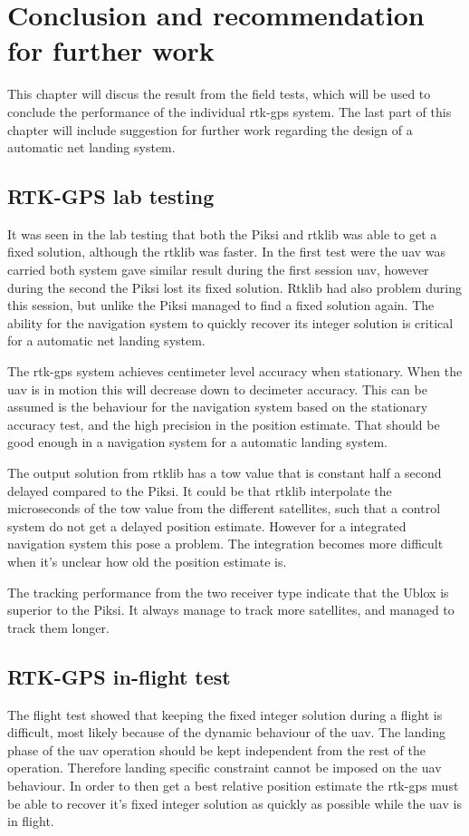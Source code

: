 
\chapter{Conclusion and recommendation for further work}
This chapter will discus the result from the field tests, which will be used to conclude the performance of the individual \gls{rtk-gps} system. The last part of this chapter will include suggestion for further work regarding the design of a automatic net landing system.
\section{RTK-GPS lab testing}
It was seen in the lab testing that both the Piksi and \gls{rtklib} was able to get a fixed solution, although the \gls{rtklib} was faster. In the first test were the \gls{uav} was carried both system gave similar result during the first session \gls{uav}, however during the second the Piksi lost its fixed solution. Rtklib had also problem during this session, but unlike the Piksi managed to find a fixed solution again. The ability for the navigation system to quickly recover its integer solution is critical for a automatic net landing system.

The \gls{rtk-gps} system achieves centimeter level accuracy when stationary. When the \gls{uav} is in motion this will decrease down to decimeter accuracy. This can be assumed is the behaviour for the navigation system based on the stationary accuracy test, and the high precision in the position estimate. That should be good enough in a navigation system for a automatic landing system.

The output solution from \gls{rtklib} has a \acrfull{tow} value that is constant half a second delayed compared to the Piksi. It could be that \gls{rtklib} interpolate the microseconds of the \gls{tow} value from the different satellites, such that a control system do not get a delayed position estimate. However for a integrated navigation system this pose a problem. The integration becomes more difficult when it's unclear how old the position estimate is.

The tracking performance from the two receiver type indicate that the Ublox is superior to the Piksi. It always manage to track more satellites, and managed to track them longer.
\section{RTK-GPS in-flight test}
The flight test showed that keeping the fixed integer solution during a flight is difficult, most likely because of the dynamic behaviour of the \gls{uav}. The landing phase of the \gls{uav} operation should be kept independent from the rest of the operation. Therefore landing specific constraint cannot be imposed on the \gls{uav} behaviour. In order to then get a best relative position estimate the \gls{rtk-gps} must be able to recover it's fixed integer solution as quickly as possible while the \gls{uav} is in flight.

